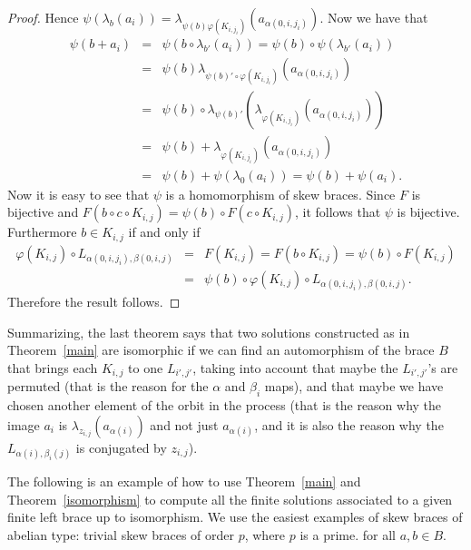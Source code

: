 \begin{proof}
	Hence
	$\psi(\lambda_b(a_i))=\lambda_{\psi(b)\varphi(K_{i,j_i})}(a_{\alpha(0,i,j_i)})$.
	Now we have that
	\begin{eqnarray*}
		\psi(b+a_i)&=&\psi(b\circ \lambda_{b'}(a_i))=\psi(b)\circ \psi(\lambda_{b'}(a_i))\\
		&=&\psi(b)\lambda_{\psi(b)'\circ \varphi(K_{i,j_i})}(a_{\alpha(0,i,j_i)})\\
		&=&\psi(b)\circ \lambda_{\psi(b)'}(\lambda_{\varphi(K_{i,j_i})}(a_{\alpha(0,i,j_i)}))\\
		&=&\psi(b)+\lambda_{\varphi(K_{i,j_i})}(a_{\alpha(0,i,j_i)})\\
		&=&\psi(b)+\psi(\lambda_{0}(a_i))=\psi(b)+\psi(a_i).
	\end{eqnarray*}
	Now it is easy to see that $\psi$ is a homomorphism of  skew braces.
	Since $F$ is bijective and $F(b\circ c\circ K_{i,j})=\psi(b)\circ F(c\circ K_{i,j})$, it
	follows that $\psi$ is bijective. Furthermore $b\in K_{i,j}$ if and
	only if
	\begin{eqnarray*}
		\varphi(K_{i,j})\circ L_{\alpha(0,i,j_i),\beta(0,i,j)}&=&F(K_{i,j})=F(b\circ K_{i,j})=\psi(b)\circ F(K_{i,j})\\
		&=&\psi(b)\circ \varphi(K_{i,j})\circ L_{\alpha(0,i,j_i),\beta(0,i,j)}.
	\end{eqnarray*}
	Therefore the result follows.
\end{proof}

Summarizing, the last theorem says that two solutions constructed as
in Theorem~\ref{main} are isomorphic if we can find an automorphism
of the brace $B$ that brings each $K_{i,j}$ to one $L_{i',j'}$,
taking into account that maybe the $L_{i',j'}$'s are permuted (that
is the reason for the $\alpha$ and $\beta_i$ maps), and that maybe
we have chosen another element of the orbit in the process (that is
the reason why the image $a_i$ is $\lambda_{z_{i,j}}(a_{\alpha(i)})$
and not just $a_{\alpha(i)}$, and it is also the reason why the
$L_{\alpha(i),\beta_i(j)}$ is conjugated by $z_{i,j}$).


The following is an example of how to use  Theorem~\ref{main} and
Theorem~\ref{isomorphism} to compute all the finite solutions
associated to a given finite left brace up to isomorphism. We use
the easiest examples of skew braces of abelian type: trivial skew braces of order $p$, where
$p$ is a prime. 
for all $a,b\in B$.


